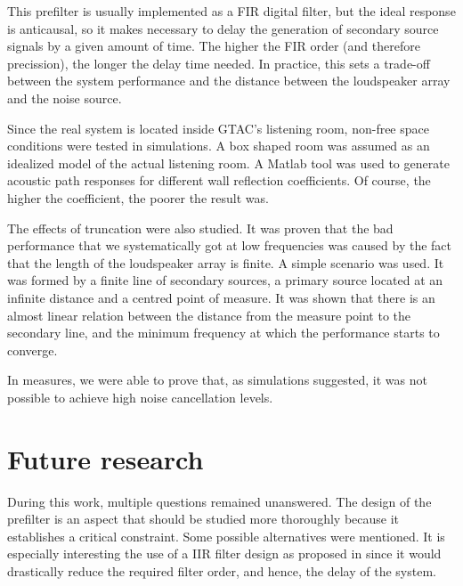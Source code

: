 This prefilter is usually implemented as a FIR digital filter, but the ideal response is anticausal, so it makes necessary to delay the generation of secondary source signals by a given amount of time. The higher the FIR order (and therefore precission), the longer the delay time needed. In practice, this sets a trade-off between the system performance and the distance between the loudspeaker array and the noise source.

Since the real system is located inside GTAC's listening room, non-free space conditions were tested in simulations. A box shaped room was assumed as an idealized model of the actual listening room. A Matlab tool was used to generate acoustic path responses for different wall reflection coefficients. Of course, the higher the coefficient, the poorer the result was.

The effects of truncation were also studied. It was proven that the bad performance that we systematically got at low frequencies was caused by the fact that the length of the loudspeaker array is finite. A simple scenario was used. It was formed by a finite line of secondary sources, a primary source located at an infinite distance and a centred point of measure. It was shown that there is an almost linear relation between the distance from the measure point to the secondary line, and the minimum frequency at which the performance starts to converge.

In measures, we were able to prove that, as simulations suggested, it was not possible to achieve high noise cancellation levels.

\section{Future research}
During this work, multiple questions remained unanswered. The design of the prefilter is an aspect that should be studied more thoroughly because it establishes a critical constraint. Some possible alternatives were mentioned. It is especially interesting the use of a IIR filter design as proposed in \cite{FrankSchutz2015} since it would drastically reduce the required filter order, and hence, the delay of the system.


